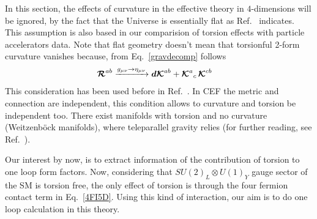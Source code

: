 \documentclass[twocolumn,showpacs,showkeys,prd,superscriptaddress]{revtex4-1}
\begin{document}
In this section, the effects of curvature in the effective theory in $4$-dimensions will be ignored, by the fact that the Universe is essentially flat as Ref.~\cite{Larson:2010gs} indicates. This assumption is also based in our comparision of torsion effects with particle accelerators data. Note that flat geometry doesn't mean that torsionful 2-form curvature vanishes because, from Eq.~\eqref{gravdecomp} follows 
\begin{align}
  {\boldsymbol{\mathcal{R}}}^{a b} &\xrightarrow[]{g_{\mu\nu}\rightarrow\eta_{\mu\nu}} {\boldsymbol{d}}{\boldsymbol{\mathcal{K}}}^{a b} + {\boldsymbol{\mathcal{K}}}^{a}{}_{c}\,{\boldsymbol{\mathcal{K}}}^{c b} 
\end{align}
This consideration has been used before in Ref.~\cite{Carroll:1994dq,Belyaev:1998ax,Kostelecky:2007kx}. In CEF the metric and connection are independent, this condition allows to curvature and torsion be independent too. There exist manifolds with torsion and no curvature (Weitzenb\"ock manifolds), where teleparallel gravity relies (for further reading, see Ref.~\cite{Arcos:2005ec}). 

Our interest by now, is to extract information of the contribution of torsion to one loop form factors. Now, considering that $SU(2)_L\otimes U(1)_Y$ gauge sector of the SM is torsion free, the only effect of torsion is through the four fermion contact term in Eq.~\eqref{4FI5D}. Using this kind of interaction, our aim is to do one loop calculation in this theory. 
\end{document}
